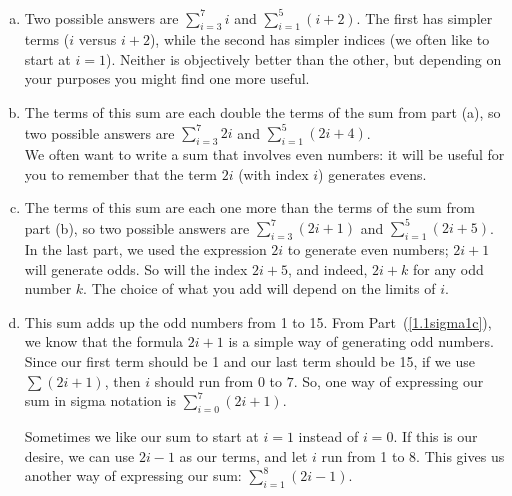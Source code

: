 \begin{solution}
\begin{enumerate}[(a)]
\item Two possible answers are $\displaystyle\sum_{i=3}^7 i$ and $\displaystyle\sum_{i=1}^5 (i+2)$. The first has simpler terms ($i$ versus $i+2$), while the second has simpler indices (we often like to start at $i=1$). Neither is objectively better than the other, but  depending on your purposes you might find one more useful.
\item The terms of this sum are each double the terms of the sum from part (a), so two possible answers are $\displaystyle\sum_{i=3}^7 2i$ and $\displaystyle\sum_{i=1}^5 (2i+4)$. \\
We often want to write a sum that involves even numbers: it will be useful for you to remember that the term  $2i$ (with index $i$) generates evens.
\item\label{1.1sigma1c} The terms of this sum are each one more than the terms of the  sum from part (b), so two possible answers are $\displaystyle\sum_{i=3}^7 (2i+1)$ and $\displaystyle\sum_{i=1}^5 (2i+5)$. \\
In the last part, we used the expression $2i$ to generate even numbers; $2i+1$ will generate odds. So will the index $2i+5$, and indeed, $2i+k$ for any odd number $k$. The choice of what you add will depend on the limits of $i$.
\item This sum adds up the odd numbers from 1 to 15. From  Part~(\ref{1.1sigma1c}), we know that the formula $2i+1$ is a simple way of generating odd numbers. Since our first term should be 1 and our last term should be 15, if we use $\sum (2i+1)$, then $i$ should run from $0$ to $7$. So, one way of expressing our sum in sigma notation is $\displaystyle\sum_{i=0}^7 (2i+1)$.

Sometimes we like our sum to start at $i=1$ instead of $i=0$. If this is our desire, we can use $2i-1$ as our terms, and let $i$ run from 1 to 8. This gives us another way of expressing our sum:
 $\displaystyle\sum_{i=1}^8 (2i-1)$.
\end{enumerate}
\end{solution}

